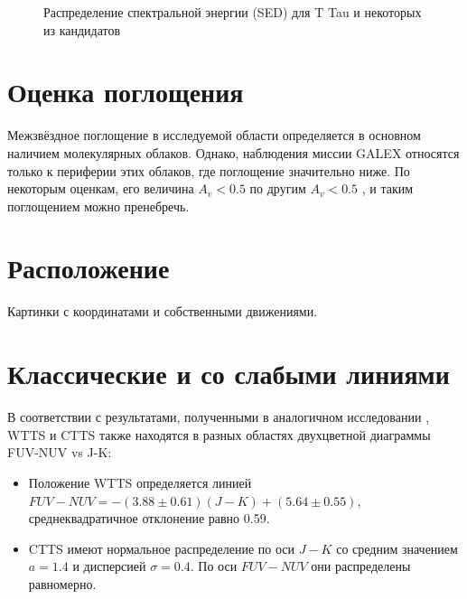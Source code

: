 \begin{figure}[ht]
\begin{minipage}[ht]{0.49\linewidth}
\end{minipage}
\hfill
\begin{minipage}[ht]{0.49\linewidth}
\end{minipage}
\begin{minipage}[ht]{0.49\linewidth}
\end{minipage}
\hfill
\begin{minipage}[ht]{0.49\linewidth}
\end{minipage}
\caption{Распределение спектральной энергии (SED) для T Tau и некоторых из кандидатов}
\label{fig:sed}
\end{figure}

\section{Оценка поглощения}

Межзвёздное поглощение в исследуемой области определяется в основном наличием молекулярных облаков. Однако, наблюдения миссии GALEX относятся только к периферии этих облаков, где поглощение значительно ниже. По некоторым оценкам, его величина $A_v < 0.5$ \cite{AIGdC2014galex} по другим $A_v < 0.5$ \cite{park2012far}, и таким поглощением можно пренебречь.

\section{Расположение}
Картинки с координатами и собственными движениями.

\section{Классические и со слабыми линиями}
В соответствии с результатами, полученными в аналогичном исследовании \cite{AIGdC2014galex}, WTTS и CTTS также находятся в разных областях двухцветной диаграммы FUV-NUV vs J-K:
\begin{itemize}
	\item Положение WTTS определяется линией $FUV - NUV = -(3.88 \pm 0.61)(J - K) + (5.64 \pm 0.55)$, среднеквадратичное отклонение равно 0.59.
	\item CTTS имеют нормальное распределение по оси $J - K$ со средним значением $a = 1.4$ и дисперсией $\sigma = 0.4$. По оси $FUV - NUV$ они распределены равномерно.
\end{itemize}

